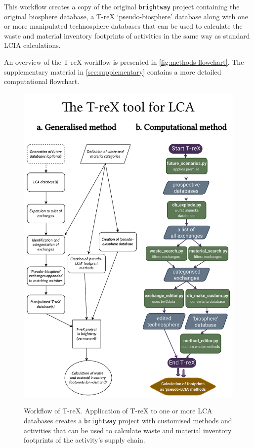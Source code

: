 This workflow creates a copy of the original \texttt{brightway} project containing the original biosphere database, a T-reX `pseudo-biosphere' database along with one or more manipulated technosphere databases that can be used to calculate the waste and material inventory footprints of activities in the same way as standard LCIA calculations.

An overview of the T-reX workflow is presented in \autoref{fig:methods-flowchart}. The supplementary material in \autoref{sec:supplementary} contains a more detailed computational flowchart.

\begin{figure}[H]
    \centering
    \caption{Workflow of T-reX. Application of T-reX to one or more LCA databases creates a \texttt{brightway} project with customised methods and activities that can be used to calculate waste and material inventory footprints of the activity's supply chain.}
    \includegraphics[width=14cm]{figures/T-reX_method.pdf}\label{fig:methods-flowchart}
\end{figure}


